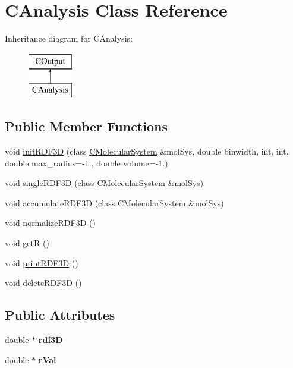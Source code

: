 \hypertarget{classCAnalysis}{}\section{C\+Analysis Class Reference}
\label{classCAnalysis}
Inheritance diagram for C\+Analysis\+:\begin{figure}[H]
\begin{center}
\leavevmode
\includegraphics[height=2.000000cm]{classCAnalysis}
\end{center}
\end{figure}
\subsection*{Public Member Functions}
\begin{DoxyCompactItemize}
\item 
void \mbox{\hyperlink{classCAnalysis_a9de7483ee6245d5b44270b103d82c923}{init\+R\+D\+F3D}} (class \mbox{\hyperlink{classCMolecularSystem}{C\+Molecular\+System}} \&mol\+Sys, double binwidth, int, int, double max\+\_\+radius=-\/1., double volume=-\/1.)
\item 
void \mbox{\hyperlink{classCAnalysis_af98ccc59633e86ecf905367b65c4635e}{single\+R\+D\+F3D}} (class \mbox{\hyperlink{classCMolecularSystem}{C\+Molecular\+System}} \&mol\+Sys)
\item 
void \mbox{\hyperlink{classCAnalysis_a3f2969c8e2e2ca69cf80de4210c27a2e}{accumulate\+R\+D\+F3D}} (class \mbox{\hyperlink{classCMolecularSystem}{C\+Molecular\+System}} \&mol\+Sys)
\item 
void \mbox{\hyperlink{classCAnalysis_a1716c9da84e9d41cbb32b97f7708e9f7}{normalize\+R\+D\+F3D}} ()
\item 
void \mbox{\hyperlink{classCAnalysis_ac90e1a07030a0954036f4461562b0c1b}{getR}} ()
\item 
void \mbox{\hyperlink{classCAnalysis_adf290a55dbb19e9150f03d45fb419cee}{print\+R\+D\+F3D}} ()
\item 
void \mbox{\hyperlink{classCAnalysis_ae54948a0123c7ef52857e47363923500}{delete\+R\+D\+F3D}} ()
\end{DoxyCompactItemize}
\subsection*{Public Attributes}
\begin{DoxyCompactItemize}
\item 
\mbox{\label{classCAnalysis_aa7139079b0f7af4b564352a8d536a79f}} 
double $\ast$ {\bfseries rdf3D}
\item 
\mbox{\label{classCAnalysis_aece0c0ea1ca3288218cb6ce4301e2a76}} 
double $\ast$ {\bfseries r\+Val}
\end{DoxyCompactItemize}


